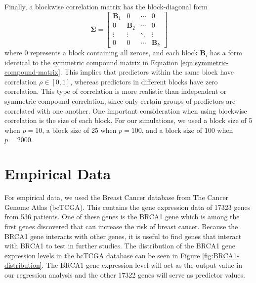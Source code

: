 \documentclass{article}
\begin{document}
Finally, a blockwise correlation matrix has the block-diagonal form
\begin{equation}
	\mathbf{\Sigma} = \begin{bmatrix}
		\mathbf{B}_1 & 0 & \cdots & 0 \\
		0 & \mathbf{B}_2 & \cdots & 0 \\
		\vdots & \vdots & \ddots & \vdots \\
		0 & 0 & \cdots & \mathbf{B}_k
	\end{bmatrix}
\end{equation}
where $0$ represents a block containing all zeroes, and each block $\mathbf{B}_i$ has a form identical to the symmetric compound matrix in Equation \ref{eqn:symmetric-compound-matrix}. This implies that predictors within the same block have correlation $\rho\in [0, 1]$, whereas predictors in different blocks have zero correlation. This type of correlation is more realistic than independent or symmetric compound correlation, since only certain groups of predictors are correlated with one another. One important consideration when using blockwise correlation is the size of each block. For our simulations, we used a block size of 5 when $p = 10$, a block size of 25 when $p = 100$, and a block size of 100 when $p = 2000$.

\section{Empirical Data}

For empirical data, we used the Breast Cancer database from The Cancer Genome Atlas (bcTCGA). This contains the gene expression data of 17323 genes from 536 patients. One of these genes is the BRCA1 gene which is among the first genes discovered that can increase the risk of breast cancer. Because the BRCA1 gene interacts with other genes, it is useful to find genes that interact with BRCA1 to test in further studies. The distribution of the BRCA1 gene expression levels in the bcTCGA database can be seen in Figure \ref{fig:BRCA1-distribution}. The BRCA1 gene expression level will act as the output value in our regression analysis and the other 17322 genes will serve as predictor values.
\end{document}

